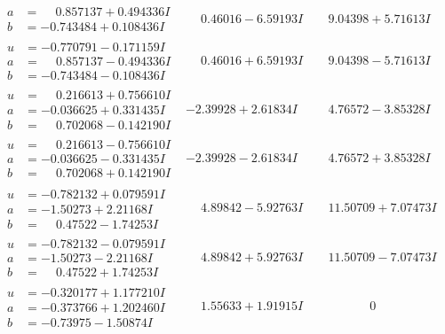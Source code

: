 \documentclass[1p]{elsarticle_modified}
\theoremstyle{definition}
\begin{document}
$$\begin{array}{c|c|c}
\begin{aligned}
a &= \phantom{-}0.857137 + 0.494336 I \\
b &= -0.743484 + 0.108436 I\end{aligned}
 & \phantom{-}0.46016 - 6.59193 I & \phantom{-}9.04398 + 5.71613 I \\ \hline\begin{aligned}
u &= -0.770791 - 0.171159 I \\
a &= \phantom{-}0.857137 - 0.494336 I \\
b &= -0.743484 - 0.108436 I\end{aligned}
 & \phantom{-}0.46016 + 6.59193 I & \phantom{-}9.04398 - 5.71613 I \\ \hline\begin{aligned}
u &= \phantom{-}0.216613 + 0.756610 I \\
a &= -0.036625 + 0.331435 I \\
b &= \phantom{-}0.702068 - 0.142190 I\end{aligned}
 & -2.39928 + 2.61834 I & \phantom{-}4.76572 - 3.85328 I \\ \hline\begin{aligned}
u &= \phantom{-}0.216613 - 0.756610 I \\
a &= -0.036625 - 0.331435 I \\
b &= \phantom{-}0.702068 + 0.142190 I\end{aligned}
 & -2.39928 - 2.61834 I & \phantom{-}4.76572 + 3.85328 I \\ \hline\begin{aligned}
u &= -0.782132 + 0.079591 I \\
a &= -1.50273 + 2.21168 I \\
b &= \phantom{-}0.47522 - 1.74253 I\end{aligned}
 & \phantom{-}4.89842 - 5.92763 I & \phantom{-}11.50709 + 7.07473 I \\ \hline\begin{aligned}
u &= -0.782132 - 0.079591 I \\
a &= -1.50273 - 2.21168 I \\
b &= \phantom{-}0.47522 + 1.74253 I\end{aligned}
 & \phantom{-}4.89842 + 5.92763 I & \phantom{-}11.50709 - 7.07473 I \\ \hline\begin{aligned}
u &= -0.320177 + 1.177210 I \\
a &= -0.373766 + 1.202460 I \\
b &= -0.73975 - 1.50874 I\end{aligned}
 & \phantom{-}1.55633 + 1.91915 I & \phantom{-0.000000 } 0 \\ \hline\begin{aligned}

\end{aligned}
\end{array}$$
\end{document}
